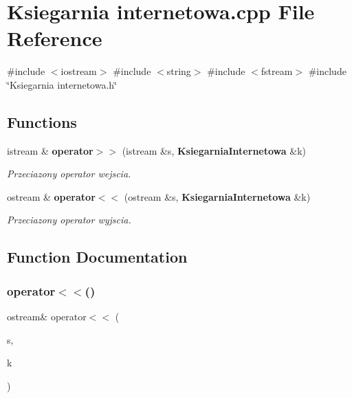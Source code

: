 \section{Ksiegarnia internetowa.\+cpp File Reference}
\label{_ksiegarnia_01internetowa_8cpp}
{\ttfamily \#include $<$iostream$>$}\newline
{\ttfamily \#include $<$string$>$}\newline
{\ttfamily \#include $<$fstream$>$}\newline
{\ttfamily \#include \char`\"{}Ksiegarnia internetowa.\+h\char`\"{}}\newline
\subsection*{Functions}
\begin{DoxyCompactItemize}
\item 
istream \& \textbf{ operator$>$$>$} (istream \&s, \textbf{ Ksiegarnia\+Internetowa} \&k)
\begin{DoxyCompactList}\small\item\em Przeciazony operator wejscia. \end{DoxyCompactList}\item 
ostream \& \textbf{ operator$<$$<$} (ostream \&s, \textbf{ Ksiegarnia\+Internetowa} \&k)
\begin{DoxyCompactList}\small\item\em Przeciazony operator wyjscia. \end{DoxyCompactList}\end{DoxyCompactItemize}


\subsection{Function Documentation}
\mbox{\label{_ksiegarnia_01internetowa_8cpp_acbed3e5b8b7c750fb018937826d93955}} 
\subsubsection{operator$<$$<$()}
{\footnotesize\ttfamily ostream\& operator$<$$<$ (\begin{DoxyParamCaption}\item[{ostream \&}]{s,  }\item[{\textbf{ Ksiegarnia\+Internetowa} \&}]{k }\end{DoxyParamCaption})}



